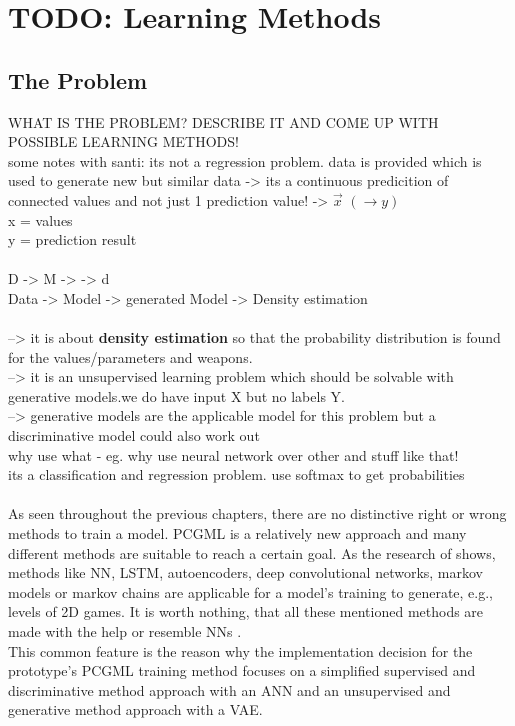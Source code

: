 \documentclass[MGS,Master,english]{twbook}%
\begin{document}
\section{TODO: Learning Methods}


\subsection{The Problem}
{\color{blue}
WHAT IS THE PROBLEM? DESCRIBE IT AND COME UP WITH POSSIBLE LEARNING METHODS!\\
some notes with santi: its not a regression problem. data is provided which is used to generate new but similar data -> its a continuous predicition of connected values and not just 1 prediction value! -> $\vec{x}$ \sout{$(\rightarrow y)$} \\
x = values\\
y = prediction result\\
\\
D -> M ->  -> d\\
Data -> Model -> generated Model -> Density estimation\\
	\\
--> it is about \textbf{density estimation} so that the probability distribution is found for the values/parameters and weapons.\\
--> it is an unsupervised learning problem which should be solvable with generative models.we do have input X but no labels Y.\\
--> generative models are the applicable model for this problem but a discriminative model could also work out\\
 why use what - eg. why use neural network over other and stuff like that!\\
 its a classification and regression problem. use softmax to get probabilities\\
 \\	
As seen throughout the previous chapters, there are no distinctive right or wrong methods to train a model. PCGML is a relatively new approach and many different methods are suitable to reach a certain goal. As the research of \cite{pcgml::paper} shows, methods like \ac{NN}, \ac{LSTM}, autoencoders, deep convolutional networks, markov models or markov chains are applicable for a model's training to generate, e.g., levels of \ac{2D} games. It is worth nothing, that all these mentioned methods are made with the help or resemble \acp{NN} \cite{neuralNetworkZoo}. \\
This common feature is the reason why the implementation decision for the prototype's PCGML training method focuses on a simplified supervised and discriminative method approach with an \ac{ANN} and an unsupervised and generative method approach with a \ac{VAE}. \\

}
\end{document}
